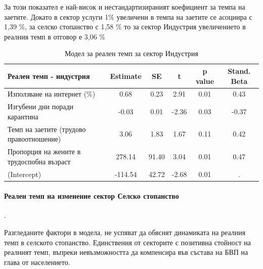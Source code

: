 \documentclass[a4paper,12pt]{article}
\begin{document}
За този показател е най-висок и нестандартизираният коефициент за темпа на заетите. Докато в сектор услуги 1\% увеличени в темпа на заетите се асоциира с 1,39 \%, за селско стопанство с 1,58 \% то за сектор Индустрия увеличението в реалния темп в отговор е 3,06 \%

\begin{table}[H]
	\centering
	\caption{Модел за реален темп за сектор Индустрия}
	\begin{tabular}{lccccc}
		\toprule
		Реален темп - индустрия & Estimate & SE    & t     & p value & Stand. Beta \\
		\midrule
		Използване на интернет (\%) & 0.68  & 0.23  & 2.91  & 0.01  & 0.43 \\
		Изгубени дни поради карантина  & -0.03 & 0.01  & -2.36 & 0.03  & -0.37 \\
		Темп на заетите (трудово правоотношение) & 3.06  & 1.83  & 1.67  & 0.11  & 0.42 \\
		Пропорция на жените в трудоспобна възраст  & 278.14 & 91.40 & 3.04  & 0.01  & 0.47 \\
		(Intercept) & -114.54 & 42.72 & -2.68 & 0.01  & . \\
		\bottomrule
	\end{tabular}%
	\label{tab:addlabel}%
\end{table}%


\paragraph{Реален темп на изменение сектор Селско стопанство}.

Разгледаните фактори в модела, не успяват да обяснят динамиката на реалния темп в селското стопанство. Единствения от секторите с позитивна стойност на реалният темп, въпреки невъзможността да компенсира във състава на БВП на глава от населението. 
\end{document}
